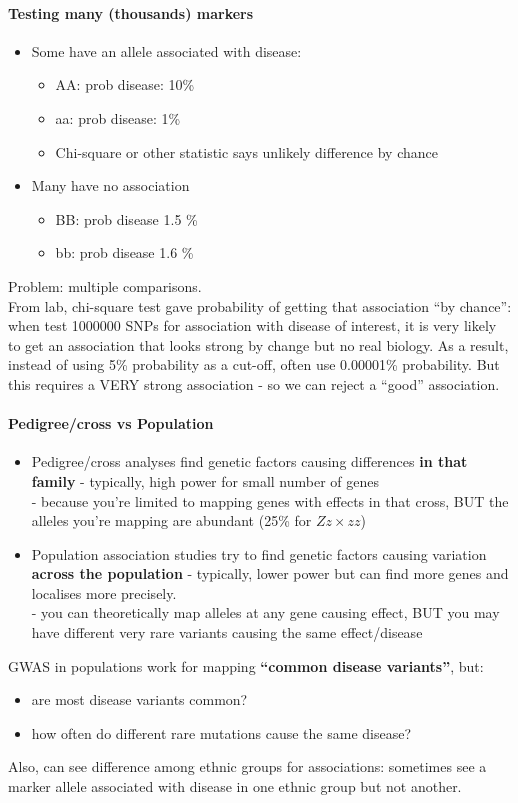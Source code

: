 \documentclass{scrartcl}
\begin{document}
\paragraph{Testing many (thousands) markers}
\begin{itemize}
\item Some have an allele associated with disease:
  \begin{itemize}
  \item AA: prob disease: 10\%
  \item aa: prob disease: 1\%
  \item Chi-square or other statistic says unlikely difference by chance
  \end{itemize}
\item Many have no association
  \begin{itemize}
  \item BB: prob disease 1.5 \%
  \item bb: prob disease 1.6 \%
  \end{itemize}
\end{itemize}
Problem: multiple comparisons. \\
From lab, chi-square test gave probability of getting that association ``by chance'': when test 1000000 SNPs for association with disease of interest, it is very likely to get an association that looks strong by change but no real biology.
As a result, instead of using 5\% probability as a cut-off, often use 0.00001\% probability.
But this requires a VERY strong association - so we can reject a ``good'' association.

\paragraph{Pedigree/cross vs Population}
\begin{itemize}
\item Pedigree/cross analyses find genetic factors causing differences {\bf in that family} - typically, high power for small number of genes\\
  - because you're limited to mapping genes with effects in that cross, BUT the alleles you're mapping are abundant (25\% for $Zz \times zz$)
\item Population association studies try to find genetic factors causing variation {\bf across the population} - typically, lower power but can find more genes and localises more precisely.\\
  - you can theoretically map alleles at any gene causing effect, BUT you may have different very rare variants causing the same effect/disease
\end{itemize}
GWAS in populations work for mapping {\bf ``common disease variants''}, but:
\begin{itemize}
\item are most disease variants common?
\item how often do different rare mutations cause the same disease?
\end{itemize}
Also, can see difference among ethnic groups for associations: sometimes see a marker allele associated with disease in one ethnic group but not another.
\end{document}
